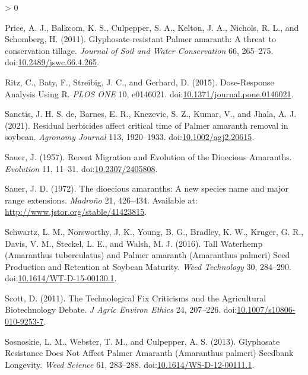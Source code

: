 \documentclass[utf8]{frontiersSCNS}
\newlength{\cslhangindent}
\newenvironment{CSLReferences}[2] %
 {%
  \setlength{\parindent}{0pt}
  \ifodd #1 \everypar{\setlength{\hangindent}{\cslhangindent}}\ignorespaces\fi
  \ifnum #2 > 0
  \setlength{\parskip}{#2\baselineskip}
  \fi
 }%
 {}
\begin{document}
\begin{CSLReferences}{1}{0}
\leavevmode\hypertarget{ref-price2011}{}%
Price, A. J., Balkcom, K. S., Culpepper, S. A., Kelton, J. A., Nichols,
R. L., and Schomberg, H. (2011). Glyphosate-resistant {Palmer} amaranth:
{A} threat to conservation tillage. \emph{Journal of Soil and Water
Conservation} 66, 265--275.
doi:\href{https://doi.org/10.2489/jswc.66.4.265}{10.2489/jswc.66.4.265}.

\leavevmode\hypertarget{ref-ritz2015}{}%
Ritz, C., Baty, F., Streibig, J. C., and Gerhard, D. (2015).
Dose-{Response Analysis Using R}. \emph{PLOS ONE} 10, e0146021.
doi:\href{https://doi.org/10.1371/journal.pone.0146021}{10.1371/journal.pone.0146021}.

\leavevmode\hypertarget{ref-sanctis2021}{}%
Sanctis, J. H. S. de, Barnes, E. R., Knezevic, S. Z., Kumar, V., and
Jhala, A. J. (2021). Residual herbicides affect critical time of
{Palmer} amaranth removal in soybean. \emph{Agronomy Journal} 113,
1920--1933.
doi:\href{https://doi.org/10.1002/agj2.20615}{10.1002/agj2.20615}.

\leavevmode\hypertarget{ref-sauer1957}{}%
Sauer, J. (1957). Recent {Migration} and {Evolution} of the {Dioecious
Amaranths}. \emph{Evolution} 11, 11--31.
doi:\href{https://doi.org/10.2307/2405808}{10.2307/2405808}.

\leavevmode\hypertarget{ref-sauer1972}{}%
Sauer, J. D. (1972). The dioecious amaranths: A new species name and
major range extensions. \emph{Madroño} 21, 426--434. Available at:
\url{http://www.jstor.org/stable/41423815}.

\leavevmode\hypertarget{ref-schwartz2016}{}%
Schwartz, L. M., Norsworthy, J. K., Young, B. G., Bradley, K. W.,
Kruger, G. R., Davis, V. M., Steckel, L. E., and Walsh, M. J. (2016).
Tall {Waterhemp} ({Amaranthus} tuberculatus) and {Palmer} amaranth
({Amaranthus} palmeri) {Seed Production} and {Retention} at {Soybean
Maturity}. \emph{Weed Technology} 30, 284--290.
doi:\href{https://doi.org/10.1614/WT-D-15-00130.1}{10.1614/WT-D-15-00130.1}.

\leavevmode\hypertarget{ref-scott2011}{}%
Scott, D. (2011). The {Technological Fix Criticisms} and the
{Agricultural Biotechnology Debate}. \emph{J Agric Environ Ethics} 24,
207--226.
doi:\href{https://doi.org/10.1007/s10806-010-9253-7}{10.1007/s10806-010-9253-7}.

\leavevmode\hypertarget{ref-sosnoskie2013}{}%
Sosnoskie, L. M., Webster, T. M., and Culpepper, A. S. (2013).
Glyphosate {Resistance Does Not Affect Palmer Amaranth} ({Amaranthus}
palmeri) {Seedbank Longevity}. \emph{Weed Science} 61, 283--288.
doi:\href{https://doi.org/10.1614/WS-D-12-00111.1}{10.1614/WS-D-12-00111.1}.


\end{CSLReferences}
\end{document}
